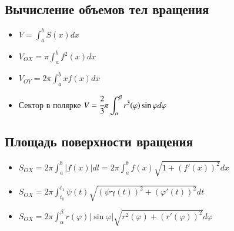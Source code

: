 \documentclass[twoside, a4paperpt]{extarticle}
\begin{document}
\subsection*{Вычисление объемов тел вращения}
\begin{itemize}
    \item $V=\displaystyle \int_{a}^{b} S(x) d x$
    \item $V_{O X}=\pi \displaystyle \int_{a}^{b} f^{2}(x) d x$
    \item $V_{O Y}=2 \pi \displaystyle \int_{a}^{b} x f(x) d x$
    \item Сектор в полярке $V=\cfrac{2}{3} \pi \displaystyle \int_{\alpha}^{\beta} r^{3}(\varphi) \sin \varphi d \varphi$ 
\end{itemize}

\subsection*{Площадь поверхности вращения}
\begin{itemize}
    \item $S_{O X}=2 \pi \displaystyle \int_{a}^{b}|f(x)| d l=2 \pi \displaystyle \int_{a}^{b} f(x) \sqrt{1+(f \prime(x))^{2}} d x$
    \item $S_{O X}=2 \pi \displaystyle \int_{t_{0}}^{t_{1}} \psi(t) \sqrt{(\psi \boldsymbol{\gamma}(t))^{2}+(\varphi \prime(t))^{2}} d t$
    \item $S_{O X}=2 \pi \displaystyle \int_{\alpha}^{\beta} r(\varphi)|\sin \varphi| \sqrt{r^{2}(\varphi)+(r \prime(\varphi))^{2}} d \varphi$
\end{itemize}
\end{document}

